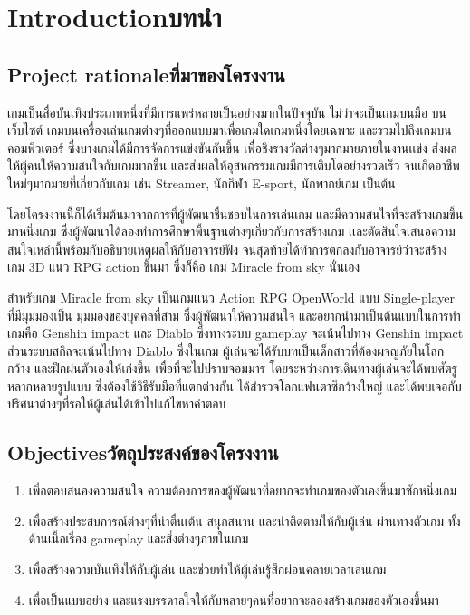 \chapter{\ifenglish Introduction\else บทนำ\fi}

\section{\ifenglish Project rationale\else ที่มาของโครงงาน\fi}
\enskip \enskip \enskip \enskip \enskip 
เกมเป็นสื่อบันเทิงประเภทหนึ่งที่มีการแพร่หลายเป็นอย่างมากในปัจจุบัน ไม่ว่าจะเป็นเกมบนมือ บนเว็บไซต์ เกมบนเครื่องเล่นเกมต่างๆที่ออกแบบมาเพื่อเกมใดเกมหนึ่งโดยเฉพาะ และรวมไปถึงเกมบนคอมพิวเตอร์ ซึ่งบางเกมได้มีการจัดการแข่งขันกันขึ้น เพื่อชิงรางวัลต่างๆมากมายภายในงานเเข่ง ส่งผลให้ผู้คนให้ความสนใจกับเกมมากขึ้น และส่งผลให้อุสหกรรมเกมมีการเติบโตอย่างรวดเร็ว จนเกิดอาชีพใหม่ๆมากมายที่เกี่ยวกับเกม เช่น Streamer, นักกีฬา E-sport, นักพากย์เกม เป็นต้น   

\enskip \enskip
โดยโครงงานนี้ก็ได้เริ่มต้นมาจากการที่ผู้พัฒนาชื่นชอบในการเล่นเกม และมีความสนใจที่จะสร้างเกมขึ้นมาหนึ่งเกม ซึ่งผู้พัฒนาได้ลองทำการศึกษาพื้นฐานต่างๆเกี่ยวกับการสร้างเกม เเละตัดสินใจเสนอความสนใจเหล่านี้พร้อมกับอธิบายเหตุผลให้กับอาจารย์ฟัง จนสุดท้ายได้ทำการตกลงกับอาจารย์ว่าจะสร้างเกม 3D แนว RPG action ขึ้นมา ซึ่งก็คือ เกม Miracle from sky นั่นเอง 

\enskip \enskip สำหรับเกม Miracle from sky เป็นเกมเเนว Action RPG OpenWorld แบบ Single-player ที่มีมุมมองเป็น มุมมองของบุคคลที่สาม ซึ่งผู้พัฒนาให้ความสนใจ และอยากนำมาเป็นต้นแบบในการทำเกมคือ Genshin impact และ Diablo ซึ่งทางระบบ gameplay จะเน้นไปทาง Genshin impact ส่วนระบบสกิลจะเน้นไปทาง Diablo ซึ่งในเกม ผู้เล่นจะได้รับบทเป็นเด็กสาวที่ต้องผจญภัยในโลกกว้าง และฝึกฝนตัวเองให้เก่งขึ้น เพื่อที่จะไปปราบจอมมาร โดยระหว่างการเดินทางผู้เล่นจะได้พบศัตรูหลากหลายรูปแบบ ซึ่งต้องใช้วิธีรับมือที่แตกต่างกัน ได้สำรวจโลกแฟนตาซีกว้างใหญ่ และได้พบเจอกับปริศนาต่างๆที่รอให้ผู้เล่นได้เข้าไปแก้ไขหาคำตอบ 
\section{\ifenglish Objectives\else วัตถุประสงค์ของโครงงาน\fi}
\begin{enumerate}
    \item เพื่อตอบสนองความสนใจ ความต้องการของผู้พัฒนาที่อยากจะทำเกมของตัวเองขึ้นมาซักหนึ่งเกม
    \item เพื่อสร้างประสบการณ์ต่างๆที่น่าตื่นเต้น สนุกสนาน และน่าติดตามให้กับผู้เล่น ผ่านทางตัวเกม ทั้งด้านเนื้อเรื่อง gameplay และสิ่งต่างๆภายในเกม
    \item เพื่อสร้างความบันเทิงให้กับผู้เล่น และช่วยทำให้ผู้เล่นรู้สึกผ่อนคลายเวลาเล่นเกม
    \item เพื่อเป็นแบบอย่าง และแรงบรรดาลใจให้กับหลายๆคนที่อยากจะลองสร้างเกมของตัวเองขึ้นมา
\end{enumerate}

